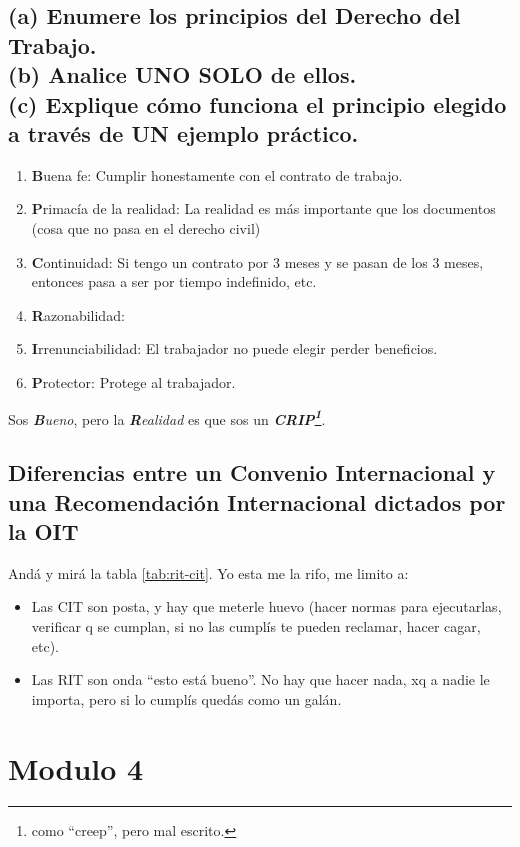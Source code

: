 \documentclass[spanish,12pt,a4paper,titlepage]{report}
\begin{document}
\subsection{(a) Enumere los principios del Derecho del Trabajo.\\(b) Analice UNO SOLO de ellos.\\(c) Explique cómo funciona el principio elegido a través de UN ejemplo práctico.}

\begin{enumerate}
\item \textbf{B}uena fe: Cumplir honestamente con el contrato de trabajo.
\item \textbf{P}rimacía de la realidad: La realidad es más importante que los documentos (cosa que no pasa en el derecho civil)\\
\item \textbf{C}ontinuidad: Si tengo un contrato por 3 meses y se pasan de los 3 meses, entonces pasa a ser por tiempo indefinido, etc.
\item \textbf{R}azonabilidad: 
\item \textbf{I}rrenunciabilidad: El trabajador no puede elegir perder beneficios.
\item \textbf{P}rotector: Protege al trabajador.
\end{enumerate}

Sos \textit{\textbf{B}ueno}, pero la \textit{\textbf{R}ealidad} es que sos un \textit{\textbf{CRIP\footnote{como ``creep'', pero mal escrito.}}}.

\subsection{Diferencias entre un Convenio Internacional y una Recomendación Internacional dictados por la OIT}

Andá y mirá la tabla \ref{tab:rit-cit}. Yo esta me la rifo, me limito a:
\begin{itemize}
\item Las CIT son posta, y hay que meterle huevo (hacer normas para ejecutarlas, verificar q se cumplan, si no las cumplís te pueden reclamar, hacer cagar, etc).
\item Las RIT son onda ``esto está bueno''. No hay que hacer nada, xq a nadie le importa, pero si lo cumplís quedás como un galán.
\end{itemize}

\section{Modulo 4}
\end{document}
